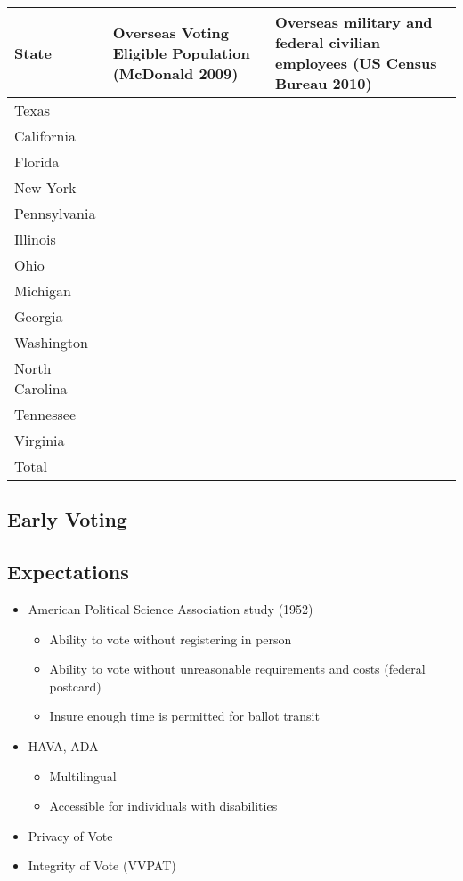 \begin{center}
\begin{tabular}{l p{} p{}} %
{\bf State} & {\bf Overseas Voting Eligible Population} (McDonald 2009) & {\bf Overseas military and federal civilian employees} (US Census Bureau 2010)\\\hline
Texas\\
California\\
Florida\\
New York\\
Pennsylvania\\
Illinois\\
Ohio\\
Michigan\\
Georgia\\
Washington\\
North Carolina\\
Tennessee\\
Virginia\\\hline
Total
\end{tabular}
\end{center}
\subsection{Early Voting}
\subsection{Expectations}

\begin{itemize}
\item American Political Science Association study (1952)
  \begin{itemize}
  \item Ability to vote without registering in person
  \item Ability to vote without unreasonable requirements and costs (federal postcard)
  \item Insure enough time is permitted for ballot transit
  \end{itemize}
\item HAVA, ADA
\begin{itemize}
  \item Multilingual
  \item Accessible for individuals with disabilities
\end{itemize}
\item Privacy of Vote
\item Integrity of Vote (VVPAT)
\end{itemize}


